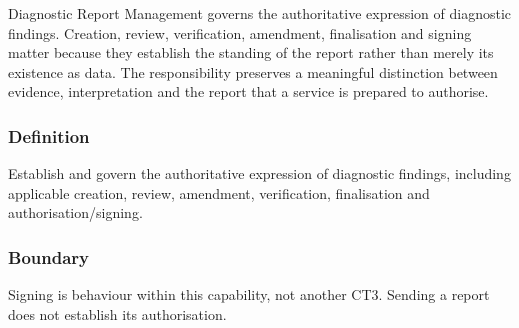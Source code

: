 Diagnostic Report Management governs the authoritative expression of diagnostic findings. Creation, review, verification, amendment, finalisation and signing matter because they establish the standing of the report rather than merely its existence as data. The responsibility preserves a meaningful distinction between evidence, interpretation and the report that a service is prepared to authorise.

\subsubsection*{Definition}

Establish and govern the authoritative expression of diagnostic findings, including applicable creation, review, amendment, verification, finalisation and authorisation/\allowbreak{}signing.

\subsubsection*{Boundary}

Signing is behaviour within this capability, not another CT3. Sending a report does not establish its authorisation.

